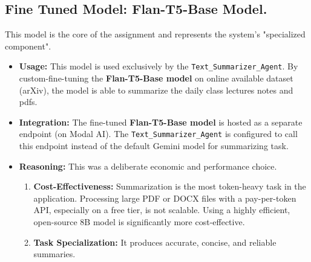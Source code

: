 \documentclass{article}
\begin{document}
\subsection{Fine Tuned Model: Flan-T5-Base Model.}
This model is the core of the assignment and represents the system's "specialized component".

\begin{itemize}
    \item \textbf{Usage:} This model is used exclusively by the \texttt{Text\_Summarizer\_Agent}. By custom-fine-tuning the \textbf{Flan-T5-Base model} on online available dataset (arXiv), the model is able to summarize the daily class lectures notes and pdfs.
    \item \textbf{Integration:} The fine-tuned \textbf{Flan-T5-Base model} is hosted as a separate endpoint (on Modal AI). The \texttt{Text\_Summarizer\_Agent} is configured to call this endpoint instead of the default Gemini model for summarizing task.
    \item \textbf{Reasoning:} This was a deliberate economic and performance choice. 
        \begin{enumerate}
            \item \textbf{Cost-Effectiveness:} Summarization is the most token-heavy task in the application. Processing large PDF or DOCX files with a pay-per-token API, especially on a free tier, is not scalable. Using a highly efficient, open-source 8B model is significantly more cost-effective.
            \item \textbf{Task Specialization:} It produces accurate, concise, and reliable summaries.
        \end{enumerate}
\end{itemize}
\end{document}
